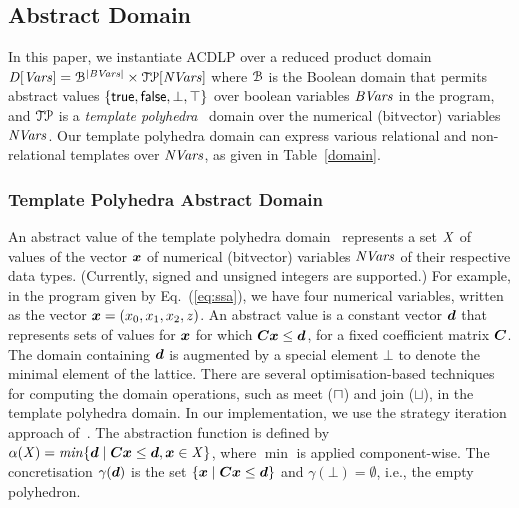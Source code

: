 \subsection{Abstract Domain}
In this paper, we instantiate ACDLP over a reduced product domain~\cite{CC79}
$\mathit{D}[\mathit{Vars}]=\mathcal{B}^{|\mathit{BVars}|}\times\mathcal{TP}[\mathit{NVars}]$ where
$\mathcal{B}$ is the Boolean domain that permits abstract values
$\{\mathsf{true},\mathsf{false},\bot,\top\}$ over boolean variables $\mathit{BVars}$ in the
program, and $\mathcal{TP}$ is a \textit{template polyhedra}~\cite{vmcai05}
domain over the numerical (bitvector) variables $\mathit{NVars}$.  Our template
polyhedra domain can express various relational and non-relational templates
over $\mathit{NVars}$, as given in Table~\ref{domain}.
% 
\subsubsection{Template Polyhedra Abstract Domain}
%
An abstract value of the template polyhedra domain~\cite{vmcai05}
represents a set $\mathit{X}$ of values of the vector ${\boldsymbol {x}}$ 
of numerical (bitvector) variables $\mathit{NVars}$ of their respective
data types. (Currently, signed and unsigned integers are supported.)
For example, in the program given by Eq.~(\ref{eq:ssa}), we have four 
numerical variables, written as the vector ${\boldsymbol {x}} = (x_0,x_1,x_2,z)$.  
An abstract value is a constant vector ${\boldsymbol {d}}$ that represents 
sets of values for ${\boldsymbol {x}}$ for which 
${\boldsymbol C}{\boldsymbol {x}}\leq{\boldsymbol {d}}$, for a fixed coefficient 
matrix ${\boldsymbol C}$.  The domain containing ${\boldsymbol {d}}$ is augmented 
by a special element $\bot$ to denote the minimal element of the lattice.  
%
There are several optimisation-based 
techniques~\cite{vmcai05} for computing the domain operations, 
such as meet ($\sqcap$) and join ($\sqcup$), in the template polyhedra domain.  
In our implementation, we use the strategy iteration approach of~\cite{BJKS15}.
%
The abstraction function is defined by $\alpha(\mathit{X}) = \mathit{min} \{{\boldsymbol {d}}\mid
{\boldsymbol C}{\boldsymbol {x}}\leq{\boldsymbol {d}}, {\boldsymbol {x}}\in \mathit{X}\}$, where 
$\min$ is applied component-wise.  The concretisation $\gamma({\boldsymbol {d}})$ is the set $\{{\boldsymbol {x}}\mid
{\boldsymbol C}{\boldsymbol {x}}\leq{\boldsymbol {d}}\}$ and $\gamma(\bot)=\emptyset$,
i.e., the empty polyhedron.

